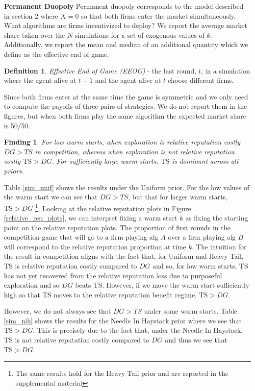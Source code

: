 \documentclass[letterpaper]{article}
\theoremstyle{definition}
\newtheorem{definition}{Definition}
\newtheorem{finding}{Finding}
\newcommand{\TS}{\mathrm{TS}}
\begin{document}
\textbf{Permanent Duopoly} Permanent duopoly corresponds to the model described in section 2 where $X = 0$ so that both firms enter the market simultaneously. What algorithms are firms incentivized to deploy? We report the average market share taken over the $N$ simulations for a set of exogenous values of $k$. Additionally, we report the mean and median of an additional quantity which we define as the effective end of game.

\begin{definition}
\textit{Effective End of Game (EEOG)} - the last round, $t$, in a simulation where the agent alive at $t-1$ and the agent alive at $t$ choose different firms.
\end{definition}

Since both firms enter at the same time the game is symmetric and we only need to compute the payoffs of three pairs of strategies. We do not report them in the figures, but when both firms play the same algorithm the expected market share is 50/50.

\begin{finding}
\textit{For low warm starts, when exploration is relative reputation costly $DG >TS$ in competition, whereas when exploration is not relative reputation costly $\TS > DG$. For sufficiently large warm starts, $\TS$ is dominant across all priors.}
\end{finding}

Table \ref{sim_unif} shows the results under the Uniform prior. For the low values of the warm start we can see that $DG > TS$, but that for larger warm starts, $\TS > DG$ \footnote{The same results hold for the Heavy Tail prior and are reported in the supplemental material}. Looking at the relative reputation plots in Figure \ref{relative_rep_plots}, we can interpret fixing a warm start $k$ as fixing the starting point on the relative reputation plots. The proportion of first rounds in the competition game that will go to a firm playing alg $A$ over a firm playing alg $B$ will correspond to the relative reputation proportion at time $k$. The intuition for the result in competition aligns with the fact that, for Uniform and Heavy Tail, $\TS$ is relative reputation costly compared to $DG$ and so, for low warm starts, $\TS$ has not yet recovered from the relative reputation loss due to purposeful exploration and so $DG$ beats $\TS$. However, if we move the warm start sufficiently high so that $\TS$ moves to the relative reputation benefit regime, $\TS > DG$.

However, we do not always see that $DG > TS$ under some warm starts. Table \ref{sim_nih} shows the results for the Needle In Haystack prior where we see that $\TS > DG$. This is precisely due to the fact that, under the Needle In Haystack, $\TS$ is not relative reputation costly compared to $DG$ and thus we see that $\TS > DG$.
\end{document}
